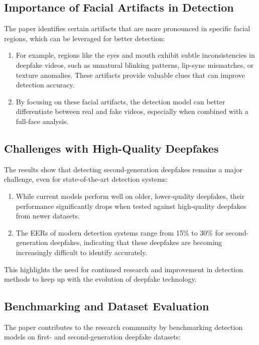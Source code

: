 \documentclass{report}
\begin{document}
	
	\subsection{Importance of Facial Artifacts in Detection}
	The paper identifies certain artifacts that are more pronounced in specific facial regions, which can be leveraged for better detection:
	
	\begin{enumerate}
		\item 
		For example, regions like the eyes and mouth exhibit subtle inconsistencies in deepfake videos, such as unnatural blinking patterns, lip-sync mismatches, or texture anomalies. These artifacts provide valuable clues that can improve detection accuracy.
		
		\item 
		By focusing on these facial artifacts, the detection model can better differentiate between real and fake videos, especially when combined with a full-face analysis.
	\end{enumerate}
	
	
	\subsection{Challenges with High-Quality Deepfakes}
	The results show that detecting second-generation deepfakes remains a major challenge, even for state-of-the-art detection systems:
	
	\begin{enumerate}
		\item 
		While current models perform well on older, lower-quality deepfakes, their performance significantly drops when tested against high-quality deepfakes from newer datasets.
		
		\item 
		The EERs of modern detection systems range from 15\% to 30\% for second-generation deepfakes, indicating that these deepfakes are becoming increasingly difficult to identify accurately.
	\end{enumerate}
	This highlights the need for continued research and improvement in detection methods to keep up with the evolution of deepfake technology.
	
	
	\subsection{Benchmarking and Dataset Evaluation}
	The paper contributes to the research community by benchmarking detection models on first- and second-generation deepfake datasets:
	
\end{document}
